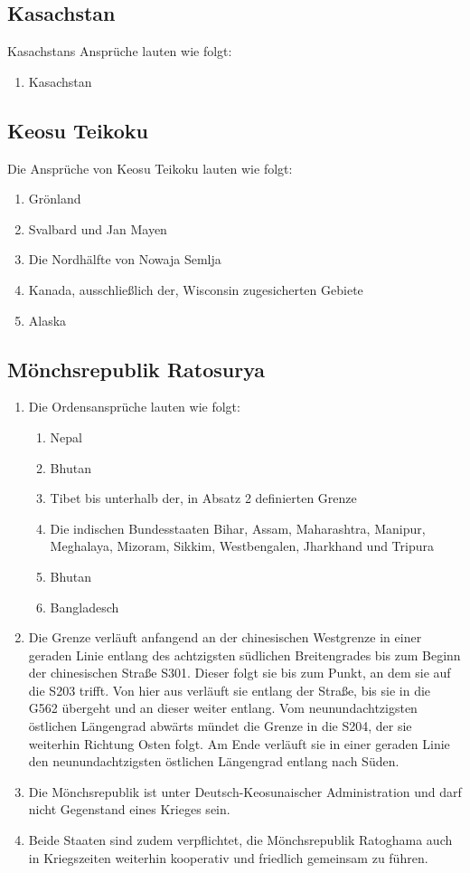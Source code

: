 \documentclass{article}
\begin{document}
\subsection{Kasachstan}
Kasachstans Ansprüche lauten wie folgt:
\begin{enumerate}
    \item Kasachstan
\end{enumerate}

\subsection{Keosu Teikoku}
Die Ansprüche von Keosu Teikoku lauten wie folgt:
\begin{enumerate}
    \item Grönland
    \item Svalbard und Jan Mayen
    \item Die Nordhälfte von Nowaja Semlja
    \item Kanada, ausschließlich der, Wisconsin zugesicherten Gebiete
    \item Alaska
\end{enumerate}

\subsection{Mönchsrepublik Ratosurya}
\begin{enumerate}[(1)]
    \item Die Ordensansprüche lauten wie folgt:
    \begin{enumerate}
        \item Nepal
        \item Bhutan
        \item Tibet bis unterhalb der, in Absatz 2 definierten Grenze
        \item Die indischen Bundesstaaten Bihar, Assam, Maharashtra, Manipur, Meghalaya, Mizoram, Sikkim, Westbengalen, Jharkhand und Tripura
        \item Bhutan
        \item Bangladesch
    \end{enumerate}
    \item Die Grenze verläuft anfangend an der chinesischen Westgrenze in einer geraden Linie entlang des achtzigsten südlichen Breitengrades
    bis zum Beginn der chinesischen Straße S301. Dieser folgt sie bis zum Punkt, an dem sie auf die S203 trifft. Von hier aus verläuft sie entlang der Straße,
    bis sie in die G562 übergeht und an dieser weiter entlang. Vom neunundachtzigsten östlichen Längengrad abwärts mündet die Grenze in die S204, der sie weiterhin Richtung Osten folgt.
    Am Ende verläuft sie in einer geraden Linie den neunundachtzigsten östlichen Längengrad entlang nach Süden. 
    \item Die Mönchsrepublik ist unter Deutsch-Keosunaischer Administration und darf nicht Gegenstand eines Krieges sein.
    \item Beide Staaten sind zudem verpflichtet, die Mönchsrepublik Ratoghama auch in Kriegszeiten weiterhin kooperativ und friedlich gemeinsam zu führen.
\end{enumerate}
\end{document}
